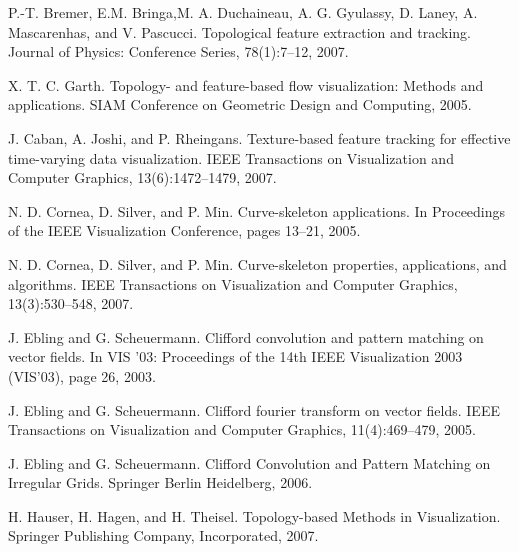 \documentclass[10pt, conference, compsocconf]{IEEEtran}
\begin{document}
%
%
%
\begin{thebibliography}{1}

\bibitem{}
P.-T. Bremer, E.M. Bringa,M. A. Duchaineau, A. G. Gyulassy, D. Laney, A. Mascarenhas, and V. Pascucci. Topological feature extraction and tracking. Journal of Physics: Conference Series, 78(1):7–12, 2007.

\bibitem{}
X. T. C. Garth. Topology- and feature-based flow visualization: Methods and applications. SIAM Conference on Geometric Design and Computing, 2005.

\bibitem{}
J. Caban, A. Joshi, and P. Rheingans. Texture-based feature tracking for effective time-varying data visualization. IEEE Transactions on Visualization and Computer Graphics, 13(6):1472–1479, 2007.

\bibitem{}
N. D. Cornea, D. Silver, and P. Min. Curve-skeleton applications. In Proceedings of the IEEE Visualization Conference, pages 13–21, 2005.

\bibitem{}
N. D. Cornea, D. Silver, and P. Min. Curve-skeleton properties, applications, and algorithms. IEEE Transactions on Visualization and Computer Graphics, 13(3):530–548, 2007.

\bibitem{}
J. Ebling and G. Scheuermann. Clifford convolution and pattern matching on vector fields. In VIS ’03: Proceedings of the 14th IEEE Visualization 2003 (VIS’03), page 26, 2003.

\bibitem{}
J. Ebling and G. Scheuermann. Clifford fourier transform on vector fields. IEEE Transactions on Visualization and Computer Graphics, 11(4):469–479, 2005.

\bibitem{}
J. Ebling and G. Scheuermann. Clifford Convolution and Pattern Matching on Irregular Grids. Springer Berlin Heidelberg, 2006.

\bibitem{}
H. Hauser, H. Hagen, and H. Theisel. Topology-based Methods in Visualization. Springer Publishing Company, Incorporated, 2007.


\end{thebibliography}
\end{document}
